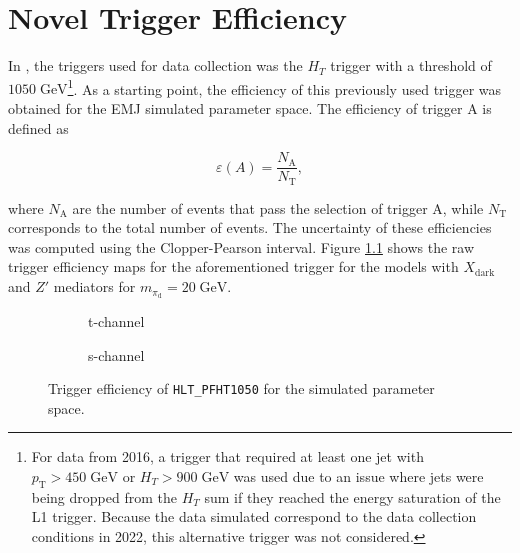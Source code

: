 \chapter{Novel Trigger Efficiency }

In \cite{cmscollaborationSearchNewPhysics2024}, the triggers used for data collection was the $H_T$ trigger with a threshold of $1050\;\text{GeV}$\footnote{For data from 2016, a trigger that required at least one jet with $p_\text{T} > 450\;\text{GeV}$ or $H_T > 900\;\text{GeV}$ was used due to an issue where jets were being dropped from the $H_T$ sum if they reached the energy saturation of the L1 trigger. Because the data simulated correspond to the data collection conditions in 2022, this alternative trigger was not considered.}. As a starting point, the efficiency of this previously used trigger was obtained for the EMJ simulated parameter space. The efficiency of trigger A is defined as

\begin{equation}
    \varepsilon(A) = \frac{N_{\text{A}}}{N_\text{T}},
\end{equation}

\noindent where $N_{\text{A}}$ are the number of events that pass the selection of trigger A, while $N_\text{T}$ corresponds to the total number of events. The uncertainty of these efficiencies was computed using the Clopper-Pearson interval. Figure \ref{fig:ht1050} shows the raw trigger efficiency maps for the aforementioned trigger for the models with $X_{\text{dark}}$ and $Z'$ mediators for $m_{\pi_{\text{d}}} = 20 \;\text{GeV}$.

\begin{figure}[h]
    \centering
    \begin{subfigure}{0.45\textwidth}
        
        \caption{t-channel}
    \end{subfigure}
    \hfill
    \begin{subfigure}{0.45\textwidth}
        
        \caption{s-channel}
    \end{subfigure}
    \caption{Trigger efficiency of \texttt{HLT\_PFHT1050} for the simulated parameter space.}
    \label{fig:ht1050}
\end{figure}

